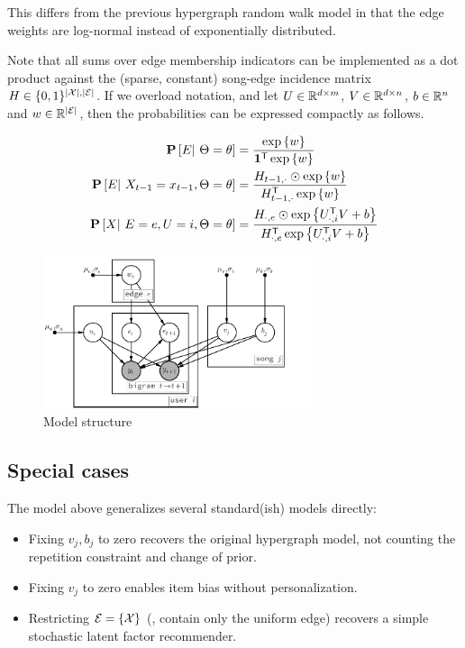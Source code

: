\documentclass{article}
\def\E{\ensuremath{\mathcal{E}}}
\begin{document}
This differs from the previous hypergraph random walk model in that the edge weights are log-normal instead of
exponentially distributed.  

Note that all sums over edge membership indicators can be implemented as a dot product against the (sparse, constant) 
song-edge incidence matrix $H \in \{0,1\}^{|\X|, |\E|}$.  If we overload notation, and let $U \in \mathbb{R}^{d\times m}$, $V \in \mathbb{R}^{d \times n}$, $b \in \mathbb{R}^{n}$ and $w \in
\R^{|\E|}$, then the probabilities can be expressed compactly as follows.

\begin{align*}
\mathbf{P}\left[E |~ \Theta=\theta\right] &= \frac{\exp\left\{w\right\}}{\mathbf{1}^\mathsf{T} \exp\left\{w\right\}}\\
\mathbf{P}\left[E |~ X_{t-1}=x_{t-1}, \Theta=\theta\right] &= \frac{ H_{t-1, \cdot} \odot \exp\left\{w\right\} }{H_{t-1, \cdot}^\mathsf{T} \exp\left\{w\right\}}\\
\mathbf{P}\left[X |~ E=e, U=i, \Theta=\theta\right] &= \frac{ H_{\cdot, e} \odot \exp\left\{U_{\cdot,i}^\mathsf{T} V + b\right\} }{ H_{\cdot, e}^\mathsf{T} \exp\left\{U_{\cdot,i}^\mathsf{T} V + b\right\}}
\end{align*}

\begin{figure}
\centering
\includegraphics[width=0.7\textwidth]{model}
\caption{Model structure}
\end{figure}

\subsection{Special cases}
The model above generalizes several standard(ish) models directly:
\begin{itemize}
\item Fixing $v_j, b_j$ to zero recovers the original hypergraph model, not counting the repetition constraint and
change of prior.
\item Fixing $v_j$ to zero enables item bias without personalization.
\item Restricting $\E = \{ \X \}$ (\ie, contain only the uniform edge) recovers a simple stochastic latent factor recommender.
\end{itemize}
\end{document}
